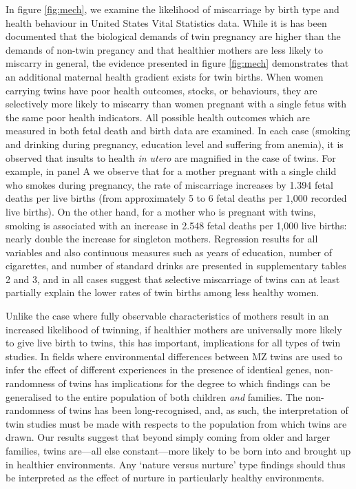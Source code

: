 \documentclass{nature}
\begin{document}
\begin{linenumbers}
In figure \ref{fig:mech}, we examine the likelihood of miscarriage by birth type and health behaviour in United States Vital Statistics data.  While it is has been documented that the biological demands of twin pregnancy are higher than the demands of non-twin pregancy\cite{Shinagawaetal2005,Kahnetal2003} and that healthier mothers are less likely to miscarry in general\cite{Frettsetal1995,Garciaetal2002}, the evidence presented in figure \ref{fig:mech} demonstrates that an additional maternal health gradient exists for twin births. When women carrying twins have poor health outcomes, stocks, or behaviours, they are selectively more likely to miscarry than women pregnant with a single fetus with the same poor health indicators.  All possible health outcomes which are measured in both fetal death and birth data are examined.  In each case (smoking and drinking during pregnancy, education level and suffering from anemia), it is observed that insults to health \emph{in utero} are magnified in the case of twins.  For example, in panel A we observe that for a mother pregnant with a single child who smokes during pregnancy, the rate of miscarriage increases by 1.394 fetal deaths per live births (from approximately 5 to 6 fetal deaths per 1,000 recorded live births).  On the other hand, for a mother who is pregnant with twins, smoking is associated with an increase in 2.548 fetal deaths per 1,000 live births: nearly double the increase for singleton mothers.  Regression results for all variables and also continuous measures such as years of education, number of cigarettes, and number of standard drinks are presented in supplementary tables 2 and 3, and in all cases suggest that selective miscarriage of twins can at least partially explain the lower rates of twin births among less healthy women.  

Unlike the case where fully observable characteristics of mothers result in an increased likelihood of twinning, if healthier mothers are universally more likely to give live birth to twins, this has important, implications for all types of twin studies.  In fields where environmental differences between MZ twins are used to infer the effect of different experiences in the presence of identical genes, non-randomness of twins has implications for the degree to which findings can be generalised to the entire population of both children \emph{and} families.  The non-randomness of twins has been long-recognised\cite{Recordetal1970}, and, as such, the interpretation of twin studies must be made with respects to the population from which twins are drawn.  Our results suggest that beyond simply coming from older and larger families, twins are---all else constant---more likely to be born into and brought up in healthier environments.  Any `nature versus nurture' type findings should thus be interpreted as the effect of nurture in particularly healthy environments.


\end{linenumbers}
\end{document}
